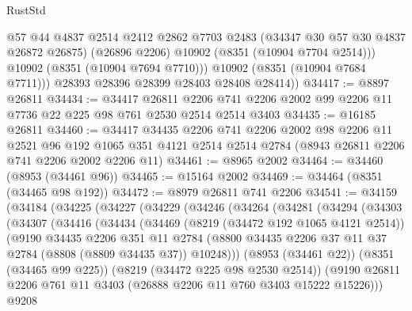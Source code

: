 \begin{lexlean}{RustStd}
\begin{coremodule}
              @57
              @44
              @4837
              @2514
              @2412
              @2862
              @7703
              @2483
              (@34347 @30 @57 @30 @4837 @26872 @26875)
              (@26896 @2206)
              @10902
              (@8351 (@10904 @7704 @2514)))
            @10902
            (@8351 (@10904 @7694 @7710)))
          @10902
          (@8351 (@10904 @7684 @7711)))
        @28393
        @28396
        @28399
        @28403
        @28408
        @28414))
@34417 := @8897 @26811
@34434 := @34417
    @26811
    @2206
    @741
    @2206
    @2002
    @99
    @2206
    @11
    @7736
    @22
    @225
    @98
    @761
    @2530
    @2514
    @2514
    @3403
@34435 := @16185 @26811
@34460 := @34417
    @34435
    @2206
    @741
    @2206
    @2002
    @98
    @2206
    @11
    @2521
    @96
    @192
    @1065
    @351
    @4121
    @2514
    @2514
    @2784
    (@8943 @26811 @2206 @741 @2206 @2002 @2206 @11)
@34461 := @8965 @2002
@34464 := @34460 (@8953 (@34461 @96))
@34465 := @15164 @2002
@34469 := @34464 (@8351 (@34465 @98 @192))
@34472 := @8979 @26811 @741 @2206
@34541 := @34159
    (@34184
      (@34225
        (@34227
          (@34229
            (@34246
              (@34264
                (@34281
                  (@34294
                    (@34303
                      (@34307
                        (@34416
                          (@34434
                            (@34469
                              (@8219 (@34472 @192 @1065 @4121 @2514))
                              (@9190
                                @34435
                                @2206
                                @351
                                @11
                                @2784
                                (@8800
                                  @34435
                                  @2206
                                  @37
                                  @11
                                  @37
                                  @2784
                                  (@8808 (@8809 @34435 @37))
                                  @10248)))
                            (@8953 (@34461 @22))
                            (@8351 (@34465 @99 @225))
                            (@8219 (@34472 @225 @98 @2530 @2514))
                            (@9190
                              @26811
                              @2206
                              @761
                              @11
                              @3403
                              (@26888 @2206 @11 @760 @3403 @15222 @15226)))
                          @9208

\end{coremodule}
\end{lexlean}
